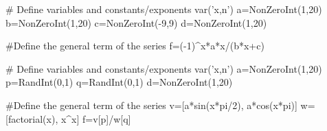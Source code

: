\begin{sagesilent}
# Define variables and constants/exponents
var('x,n')
a=NonZeroInt(1,20)
b=NonZeroInt(1,20)
c=NonZeroInt(-9,9)
d=NonZeroInt(1,20)

#Define the general term of the series
f=(-1)^x*a*x/(b*x+c)

\end{sagesilent}


\begin{sagesilent}
# Define variables and constants/exponents
var('x,n')
a=NonZeroInt(1,20)
p=RandInt(0,1)
q=RandInt(0,1)
d=NonZeroInt(1,20)

#Define the general term of the series
v=[a*sin(x*pi/2), a*cos(x*pi)]
w=[factorial(x), x^x]
f=v[p]/w[q]

\end{sagesilent}



